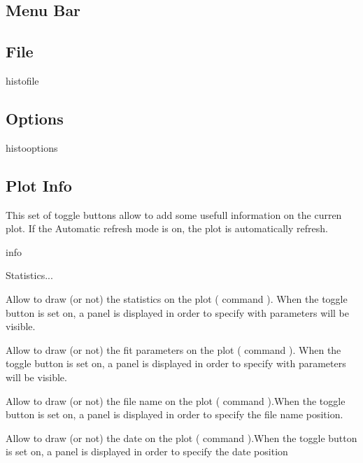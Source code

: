 \newpage

\subsection{Menu Bar}


\subsection{File}

\begin{PAWf}{histofile}
\end{PAWf}


\subsection{Options}

\begin{PAWf}{histooptions}
\end{PAWf}


\subsection{Plot Info}
This set of toggle buttons allow to add some usefull information on the
curren plot. If the Automatic refresh mode is on, the plot is automatically
refresh.

\begin{PAWf}{info}
\begin{DLsf}{Statistics...}
\item[Statistics...]  Allow to draw (or not) the statistics on the plot
                      (\XPAW{} command ). When the toggle
                      button is set on, a panel is displayed in order to
                      specify with parameters will be visible.
\item[Fits...]        Allow to draw (or not) the fit parameters on the plot
                      (\XPAW{} command ). When the toggle
                      button is set on, a panel is displayed in order to
                      specify with parameters will be visible.
\item[File Name...]   Allow to draw (or not) the file name on the plot
                      (\XPAW{} command ).When the toggle
                      button is set on, a panel is displayed in order to
                      specify the file name position.
\item[Date...]        Allow to draw (or not) the date on the plot
                      (\XPAW{} command ).When the toggle
                      button is set on, a panel is displayed in order to
                      specify the date position
\end{DLsf}
\end{PAWf}

